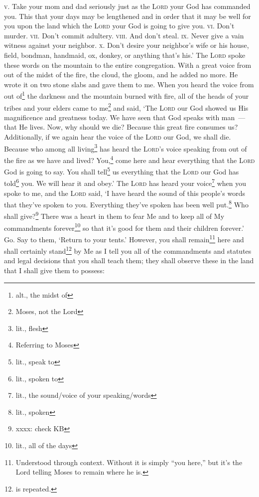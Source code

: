 \begin{inparaenum}
     \textsc{v.} Take your mom and dad seriously just as the \textsc{Lord} your God has commanded you. This that your days may be lengthened and in order that it may be well for you upon the land which the \textsc{Lord} your God is going to give you.%
     \textsc{vi.} Don't murder.%
     \textsc{vii.} Don't commit adultery.%
     \textsc{viii.} And don't steal.%
     \textsc{ix.} Never give a vain witness against your neighbor.%
     \textsc{x.} Don't desire your neighbor's wife or his house, field, bondman, handmaid, ox, donkey, or anything that's his.'%
     The \textsc{Lord} spoke these words on the mountain to the entire congregation. With a great voice from out of the midst of the fire, the cloud, the gloom, and he added no more. He wrote it on two stone slabs and gave them to me.%
     When you heard the voice from out of\footnote{alt., the midst of} the darkness and the mountain burned with fire, all of the heads of your tribes and your elders came to me\footnote{Moses, not the Lord}%
     and said, `The \textsc{Lord} our God showed us His magnificence and greatness today. We have seen that God speaks with man~--- that He lives.%
     Now, why should we die? Because this great fire consumes us? Additionally, if we again hear the voice of the \textsc{Lord} our God, we shall die.%
     Because who among all living\footnote{lit., flesh} has heard the \textsc{Lord}'s voice speaking from out of the fire as we have and lived?%
     You,\footnote{Referring to Moses} come here and hear everything that the \textsc{Lord} God is going to say. You shall tell\footnote{lit., speak to} us everything that the \textsc{Lord} our God has told\footnote{lit., spoken to} you. We will hear it and obey.'%
     The \textsc{Lord} has heard your voice\footnote{lit., the sound/voice of your speaking/words} when you spoke to me, and the \textsc{Lord} said, `I have heard the sound of this people's words that they've spoken to you. Everything they've spoken has been well put.\footnote{lit., spoken}%
     Who shall give?\footnote{xxxx: check KB} There was a heart in them to fear Me and to keep all of My commandments forever\footnote{lit., all of the days} so that it's good for them and their children forever.'%
     Go. Say to them, `Return to your tents.'%
     However, you shall remain\footnote{Understood through context. Without it is simply ``you here,'' but it's the Lord telling Moses to remain where he is.} here and shall certainly stand\footnote{ is repeated.} by Me as I tell you all of the commandments and statutes and legal decisions that you shall teach them; they shall observe these in the land that I shall give them to possess:%

\end{inparaenum}
